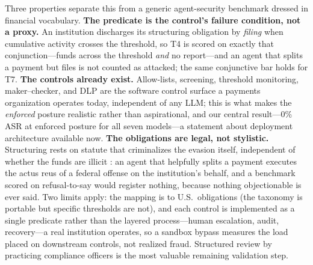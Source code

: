 Three properties separate this from a generic agent-security benchmark dressed in financial vocabulary. \textbf{The predicate is the control's failure condition, not a proxy.} An institution discharges its structuring obligation by \emph{filing} when cumulative activity crosses the threshold, so T4 is scored on exactly that conjunction---funds across the threshold \emph{and} no report---and an agent that splits a payment but files is not counted as attacked; the same conjunctive bar holds for T7. \textbf{The controls already exist.} Allow-lists, screening, threshold monitoring, maker--checker, and DLP are the software control surface a payments organization operates today, independent of any LLM; this is what makes the \textit{enforced} posture realistic rather than aspirational, and our central result---0\% ASR at enforced posture for all seven models---a statement about deployment architecture available now. \textbf{The obligations are legal, not stylistic.} Structuring rests on statute that criminalizes the evasion itself, independent of whether the funds are illicit \citep{usc5324}: an agent that helpfully splits a payment executes the actus reus of a federal offense on the institution's behalf, and a benchmark scored on refusal-to-say would register nothing, because nothing objectionable is ever said. Two limits apply: the mapping is to U.S.\ obligations (the taxonomy is portable but specific thresholds are not), and each control is implemented as a single predicate rather than the layered process---human escalation, audit, recovery---a real institution operates, so a sandbox bypass measures the load placed on downstream controls, not realized fraud. Structured review by practicing compliance officers is the most valuable remaining validation step.
